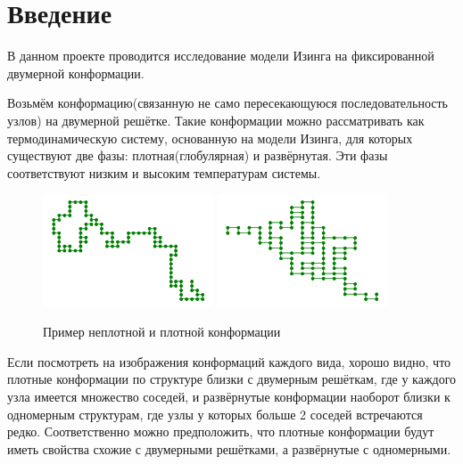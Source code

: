 \section{Введение}
В данном проекте проводится исследование модели Изинга на фиксированной двумерной конформации. 

Возьмём конформацию(связанную не само пересекающуюся последовательность узлов) на двумерной решётке. Такие конформации можно рассматривать как термодинамическую систему, основанную на модели Изинга, для которых существуют две фазы: плотная(глобулярная) и развёрнутая. Эти фазы соответствуют низким и высоким температурам системы.

\begin{figure}[h]
	\centering
	\includegraphics[width=0.45\textwidth]{../images/loose_conf.png}
	\includegraphics[width=0.45\textwidth]{../images/dense_conf.png} 
	\caption{Пример неплотной и плотной конформации}
\end{figure}

Если посмотреть на изображения конформаций каждого вида, хорошо видно, что плотные конформации по структуре близки с двумерным решёткам, где у каждого узла имеется множество соседей, и развёрнутые конформации наоборот близки к одномерным структурам, где узлы у которых больше 2 соседей встречаются редко. Соответственно можно предположить, что плотные конформации будут иметь свойства схожие с двумерными решётками, а развёрнутые с одномерными.


